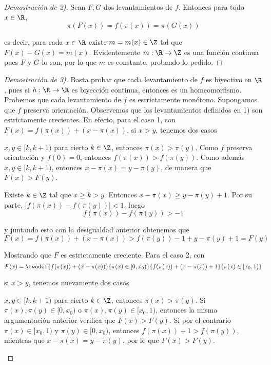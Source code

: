 \documentclass[	docname= Sistemas\ Din\'amicos,
				finished=1,
				semester=1,
				year=2017,
				professor=Godofredo\ Iommi,
				sigla=MAT2565]{apunte}
\begin{document}
\begin{proof}[Demostración de 2)] Sean $F,G$ dos levantamientos de $f$. Entonces para todo $x \in \R$,
	$$\pi(F(x)) = f(\pi(x)) = \pi(G(x))$$

es decir, para cada $x \in \R$ existe $m = m(x) \in \Z$ tal que $F(x) - G(x) = m(x)$. Evidentemente $m: \R \to \Z$ es una función continua pues $F$ y $G$ lo son, por lo que $m$ es constante, probando lo pedido.
\end{proof}

\begin{proof}[Demostración de 3)] Basta probar que cada levantamiento de $f$ es biyectivo en $\R$, pues si $h: \R \to \R$ es biyección continua, entonces es un homeomorfismo.	\\

Probemos que cada levantamiento de $f$ es estrictamente monótono. Supongamos que $f$ preserva orientación. Observemos que los levantamientos definidos en 1) son estrictamente crecientes. En efecto, para el caso 1, con $F(x) = f(\pi(x)) + (x - \pi(x))$, si $x > y$, tenemos dos casos
	\begin{casos}
		\item $x,y \in [k,k+1)$ para cierto $k \in \Z$, entonces $\pi(x) > \pi(y)$. Como $f$ preserva orientación y $f(0) = 0$, entonces $f(\pi(x)) > f(\pi(y))$. Como además $x,y \in [k,k+1)$, entonces $x - \pi(x) = y - \pi(y)$, de manera que $F(x) > F(y)$.
		
		\item Existe $k \in \Z$ tal que $x \geq k > y$. Entonces $x - \pi(x) \geq y - \pi(y) + 1$. Por su parte, $|f(\pi(x)) - f(\pi(y))| < 1$, luego
				$$f(\pi(x)) - f(\pi(y)) > -1$$
			
			y juntando esto con la desigualdad anterior obtenemos que
				$$F(x) = f(\pi(x)) + (x - \pi(x)) > f(\pi(y)) -1 + y - \pi(y) + 1 = F(y)$$			
	\end{casos}

Mostrando que $F$ es estrictamente creciente. Para el caso 2, con
	$$F(x) = \twodef{f(\pi(x)) + (x - \pi(x))}{\pi(x) \in [0,x_{0})}
							{f(\pi(x)) + (x- \pi(x)) + 1}{\pi(x) \in [x_{0},1)}
	$$

si $x > y$, tenemos nuevamente dos casos
	\begin{casos}
		\item $x,y \in [k,k+1)$ para cierto $k \in \Z$, entonces $\pi(x) > \pi(y)$. Si $\pi(x), \pi(y) \in [0,x_{0})$ o $\pi(x), \pi(y) \in [x_{0},1)$, entonces la misma argumentación anterior verifica que $F(x) > F(y)$. Si por el contrario $\pi(x) \in [x_{0}, 1)$ y $\pi(y) \in [0,x_{0})$, entonces $f(\pi(x)) + 1 > f(\pi(y))$, mientras que $x - \pi(x) = y - \pi(y)$, por lo que $F(x) > F(y)$.
		

\end{casos}
\end{proof}
\end{document}
